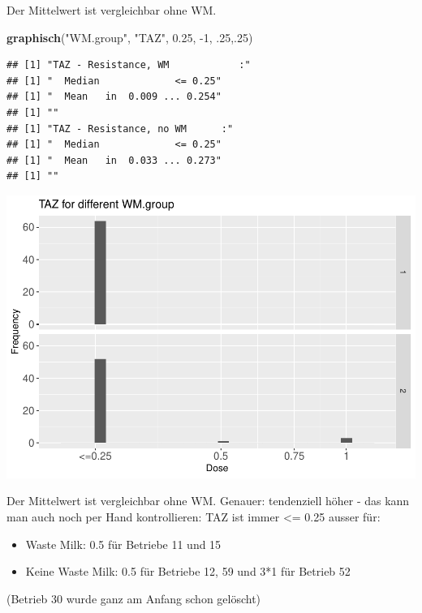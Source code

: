 \documentclass[
]{article}
\newenvironment{Shaded}{\begin{snugshade}}{\end{snugshade}}
\newcommand{\DecValTok}[1]{\textcolor[rgb]{0.00,0.00,0.81}{#1}}
\newcommand{\FloatTok}[1]{\textcolor[rgb]{0.00,0.00,0.81}{#1}}
\newcommand{\KeywordTok}[1]{\textcolor[rgb]{0.13,0.29,0.53}{\textbf{#1}}}
\newcommand{\NormalTok}[1]{#1}
\newcommand{\StringTok}[1]{\textcolor[rgb]{0.31,0.60,0.02}{#1}}
\providecommand{\tightlist}{%
  \setlength{\itemsep}{0pt}\setlength{\parskip}{0pt}}
\begin{document}
Der Mittelwert ist vergleichbar ohne WM.

\begin{Shaded}
\begin{Highlighting}[]
  \KeywordTok{graphisch}\NormalTok{(}\StringTok{"WM.group"}\NormalTok{, }\StringTok{"TAZ"}\NormalTok{, }\FloatTok{0.25}\NormalTok{, }\DecValTok{-1}\NormalTok{, }\FloatTok{.25}\NormalTok{,.}\DecValTok{25}\NormalTok{)  }
\end{Highlighting}
\end{Shaded}

\begin{verbatim}
## [1] "TAZ - Resistance, WM            :"
## [1] "  Median             <= 0.25"
## [1] "  Mean   in  0.009 ... 0.254"
## [1] ""
## [1] "TAZ - Resistance, no WM      :"
## [1] "  Median             <= 0.25"
## [1] "  Mean   in  0.033 ... 0.273"
## [1] ""
\end{verbatim}

\includegraphics{Verteilungen_files/figure-latex/unnamed-chunk-37-1.pdf}

Der Mittelwert ist vergleichbar ohne WM. Genauer: tendenziell höher -
das kann man auch noch per Hand kontrollieren: TAZ ist immer \textless=
0.25 ausser für:

\begin{itemize}
\tightlist
\item
  Waste Milk: 0.5 für Betriebe 11 und 15
\item
  Keine Waste Milk: 0.5 für Betriebe 12, 59 und 3*1 für Betrieb 52
\end{itemize}

(Betrieb 30 wurde ganz am Anfang schon gelöscht)
\end{document}
